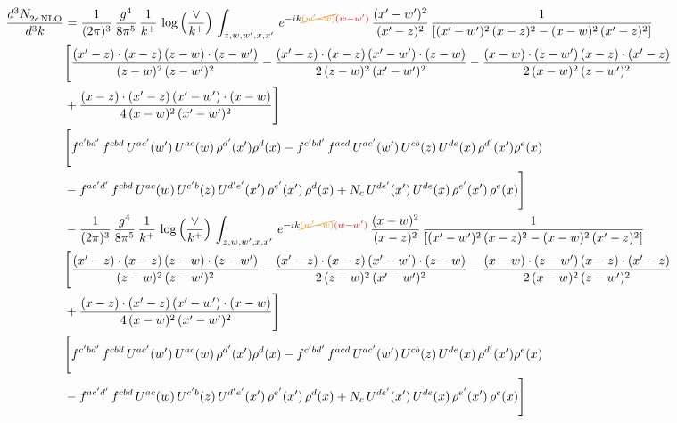 \documentclass[9pt]{article}
\numberwithin{equation}{section}
\begin{document}
\begin{align}
    \frac{d^{3}N_{2c\,\rm NLO}^{\rm}}{d^{3}k}  & =  \frac{1}{(2\pi)^{3}}\, \frac{g^{4}}{8\pi^{5}}\,\frac{1}{k^{+}}\,\log{\left(\frac{\vee}{k^{+}}\right)} \,\int_{z,w,w^{\prime},x,x'}\, e^{-ik{\color{orange}\cancel{(w^{\prime}-w)}}{\color{red}(w-w^{\prime})}}\,\frac{(x'-w')^{2}}{(x'-z)^{2}}\, \frac{1}{\left[(x'-w')^{2}\, (x-z)^{2} - (x-w)^{2}\, (x'-z)^{2}\right]} \notag \\ & \Bigg[\frac{(x'-z)\cdot (x-z)\, (z-w)\cdot (z-w')}{(z-w)^{2}\, (z-w')^{2}}-\frac{(x'-z)\cdot (x-z)\, (x'-w')\cdot (z-w)}{2\, (z-w)^{2}\, (x'-w')^{2}} -\frac{(x-w)\cdot (z-w')\, (x-z)\cdot (x'-z)}{2\, (x-w)^{2}\, (z-w')^{2}}\notag \\ & +\frac{(x-z)\cdot (x'-z)\, (x'-w')\cdot (x-w)}{4\, (x-w)^{2}\, (x'-w')^{2}}\Bigg]\notag \\ &  \Bigg[f^{c'bd'}\,f^{cbd}\, U^{ac'}(w')\,U^{ac}(w)\,\rho^{d'}(x')\rho^{d}(x)- f^{c'bd'}\,f^{acd}\,U^{ac'}(w')\,U^{cb}(z)\,U^{de}(x)\,\rho^{d'}(x')\rho^{e}(x) \notag \\ & -f^{ac'd'}\,f^{cbd}\,U^{ac}(w)\,U^{c'b}(z)\,U^{d'e'}(x')\,\rho^{e'}(x')\,\rho^{d}(x) +N_{c}\,U^{de'}(x')\,U^{de}(x)\,\rho^{e'}(x')\,\rho^{e}(x)\Bigg] \notag \\
& -\frac{1}{(2\pi)^{3}}\, \frac{g^{4}}{8\pi^{5}}\,\frac{1}{k^{+}}\,\log{\left(\frac{\vee}{k^{+}}\right)}\,\int_{z,w,w^{\prime},x,x'}\, e^{-ik{\color{orange}\cancel{(w^{\prime}-w)}}{\color{red}(w-w^{\prime})}}\,\frac{(x-w)^{2}}{(x-z)^{2}}\, \frac{1}{\left[(x'-w')^{2}\, (x-z)^{2} - (x-w)^{2}\, (x'-z)^{2}\right]} \notag \\ & \Bigg[\frac{(x'-z)\cdot (x-z)\, (z-w)\cdot (z-w')}{(z-w)^{2}\, (z-w')^{2}}-\frac{(x'-z)\cdot (x-z)\, (x'-w')\cdot (z-w)}{2\, (z-w)^{2}\, (x'-w')^{2}} -\frac{(x-w)\cdot (z-w')\, (x-z)\cdot (x'-z)}{2\, (x-w)^{2}\, (z-w')^{2}}\notag \\ & +\frac{(x-z)\cdot (x'-z)\, (x'-w')\cdot (x-w)}{4\, (x-w)^{2}\, (x'-w')^{2}}\Bigg] \notag \\ &  \Bigg[f^{c'bd'}\,f^{cbd}\, U^{ac'}(w')\,U^{ac}(w)\,\rho^{d'}(x')\rho^{d}(x)- f^{c'bd'}\,f^{acd}\,U^{ac'}(w')\,U^{cb}(z)\,U^{de}(x)\,\rho^{d'}(x')\rho^{e}(x) \notag \\ & -f^{ac'd'}\,f^{cbd}\,U^{ac}(w)\,U^{c'b}(z)\,U^{d'e'}(x')\,\rho^{e'}(x')\,\rho^{d}(x) +N_{c}\,U^{de'}(x')\,U^{de}(x)\,\rho^{e'}(x')\,\rho^{e}(x)\Bigg]
\end{align}
\end{document}
